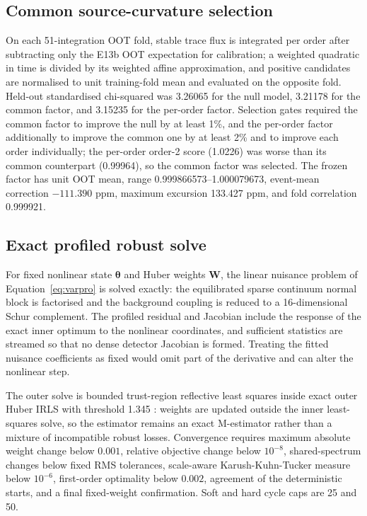 \subsection{Common source-curvature selection}

On each 51-integration OOT fold, stable trace flux is integrated per order
after subtracting only the E13b OOT expectation for calibration; a weighted
quadratic in time is divided by its weighted affine approximation, and
positive candidates are normalised to unit training-fold mean and evaluated
on the opposite fold. Held-out standardised chi-squared was 3.26065 for the
null model, 3.21178 for the common factor, and 3.15235 for the per-order
factor. Selection gates required the common factor to improve the null by at
least 1\%, and the per-order factor additionally to improve the common one
by at least 2\% and to improve each order individually; the per-order
order-2 score (1.0226) was worse than its common counterpart (0.99964), so
the common factor was selected. The frozen factor has unit OOT mean, range
0.999866573--1.000079673, event-mean correction $-111.390$ ppm, maximum
excursion 133.427 ppm, and fold correlation 0.999921.

\subsection{Exact profiled robust solve}

For fixed nonlinear state $\bm{\theta}$ and Huber weights $\bm{W}$, the
linear nuisance problem of Equation~\ref{eq:varpro} is solved exactly: the
equilibrated sparse continuum normal block is factorised and the background
coupling is reduced to a 16-dimensional Schur complement. The profiled
residual and Jacobian include the response of the exact inner optimum to the
nonlinear coordinates, and sufficient statistics are streamed so that no
dense detector Jacobian is formed. Treating the fitted nuisance coefficients
as fixed would omit part of the derivative and can alter the nonlinear step.

The outer solve is bounded trust-region reflective least squares inside
exact outer Huber IRLS with threshold 1.345
\citep{BranchColemanLi1999,Huber1964}: weights are updated outside the inner
least-squares solve, so the estimator remains an exact M-estimator rather
than a mixture of incompatible robust losses. Convergence requires maximum
absolute weight change below $0.001$, relative objective change below
$10^{-8}$, shared-spectrum changes below fixed RMS tolerances, scale-aware
Karush-Kuhn-Tucker measure below $10^{-6}$, first-order optimality below
$0.002$, agreement of the deterministic starts, and a final fixed-weight
confirmation. Soft and hard cycle caps are 25 and 50.

